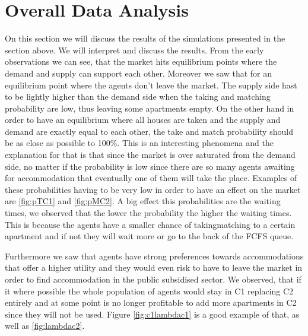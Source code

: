 \section{Overall Data Analysis}

On this section we will discuss the results of the simulations presented in the section above. We will interpret and discuss the results. From the early observations we can see, that the market hits equilibrium points where the demand and supply can support each other. Moreover we saw that for an equilibrium point where the agents don't leave the market. The supply side hast to be lightly higher than the demand side when the taking and matching probability are low, thus leaving some apartments empty. On the other hand in order to have an equilibrium where all houses are taken and the supply and demand are exactly equal to each other, the take and match probability should be as close as possible to 100\%. This is an interesting phenomena and the explanation for that is that since the market is over saturated from the demand side, no matter if the probability is low since there are so many agents awaiting for accommodation that eventually one of them will take the place. Examples of these probabilities having to be very low in order to have an effect on the market are \ref{fig:pTC1} and \ref{fig:pMC2}. A big effect this probabilities are the waiting times, we observed that the lower the probability the higher the waiting times. This is because the agents have a smaller chance of taking\/matching to a certain apartment and if not they will wait more or go to the back of the FCFS queue.

Furthermore we saw that agents have strong preferences towards accommodations that offer a higher utility and they would even risk to have to leave the market in order to find accommodation in the public subsidised sector. We observed, that if it where possible the whole population of agents would stay in C1 replacing C2 entirely and at some point is no longer profitable to add more apartments in C2 since they will not be used. Figure \ref{fig:c1lambdac1} is a good example of that, as well as \ref{fig:lambdac2}.


